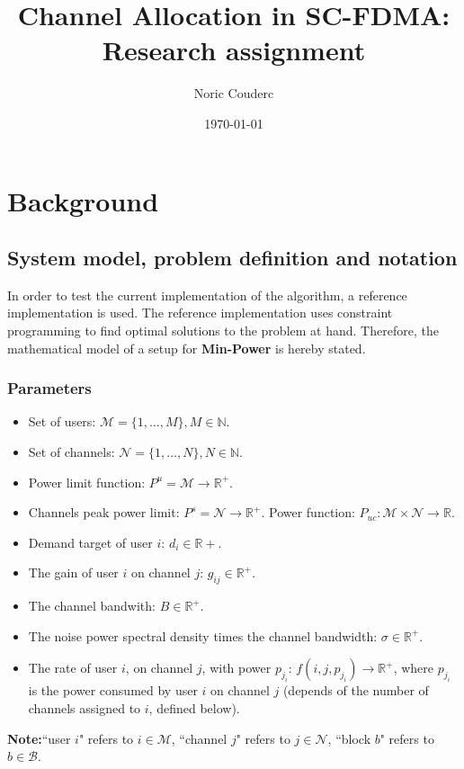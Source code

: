 \documentclass[a4paper, 10pt]{article}
\title{Channel Allocation in SC-FDMA: Research assignment}
\author{Noric Couderc}
\date{\today}
\begin{document}
\maketitle
\tableofcontents

\section{Background}

\subsection*{System model, problem definition and notation}
In order to test the current implementation of the algorithm, a reference
implementation is used. The reference implementation uses constraint programming
to find optimal solutions to the problem at hand. Therefore, the mathematical
model of a setup for \textbf{Min-Power} is hereby stated.

\subsubsection*{Parameters}

\begin{itemize}
    \item Set of users: $\mathcal{M} = \{1,\dots,M\}, M \in \mathbb{N}$.
    \item Set of channels: $\mathcal{N} = \{1,\dots,N\}, N \in \mathbb{N}$.
    \item Power limit function: $P^u = \mathcal{M} \rightarrow \mathbb{R}^+$.
    \item Channels peak power limit: $P^s = \mathcal{N} \rightarrow \mathbb{R}^+$.
    \itam Power function: $P_{uc} : \mathcal{M} \times \mathcal{N} \rightarrow \mathbb{R}$.
    \item Demand target of user $i$: $d_i \in \mathbb{R}+$.
    \item The gain of user $i$ on channel $j$: $g_{ij} \in \mathbb{R}^+$.
    \item The channel bandwith: $B \in \mathbb{R}^+$.
    \item The noise power spectral density times the channel bandwidth:
    $\sigma \in \mathbb{R}^+$.
    \item The rate of user $i$, on channel $j$, with power $p_{j_i}$:
    $f(i,j,p_{j_i})
    \rightarrow \mathbb{R}^+$, where $p_{j_i}$ is the power consumed by user
    $i$ on channel $j$ (depends of the number of 
        channels assigned to $i$, defined below). 
\end{itemize}
\textbf{Note:}``user $i$" refers to $i \in \mathcal{M}$, ``channel $j$" refers to
$j \in \mathcal{N}$, ``block $b$" refers to $b \in \mathcal{B}$.
\end{document}
